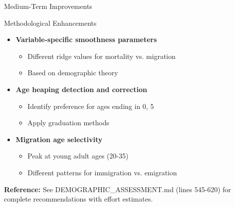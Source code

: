 \documentclass[aspectratio=169]{beamer}
\begin{document}
\begin{frame}{Medium-Term Improvements}
\begin{block}{Methodological Enhancements}
\begin{itemize}
    \item \textbf{Variable-specific smoothness parameters}
    \begin{itemize}
        \item Different ridge values for mortality vs. migration
        \item Based on demographic theory
    \end{itemize}
    
    \item \textbf{Age heaping detection and correction}
    \begin{itemize}
        \item Identify preference for ages ending in 0, 5
        \item Apply graduation methods
    \end{itemize}
    
    \item \textbf{Migration age selectivity}
    \begin{itemize}
        \item Peak at young adult ages (20-35)
        \item Different patterns for immigration vs. emigration
    \end{itemize}
\end{itemize}
\end{block}

\vspace{0.2cm}

\textbf{Reference:} See DEMOGRAPHIC\_ASSESSMENT.md (lines 545-620) for complete recommendations with effort estimates.
\end{frame}
\end{document}
